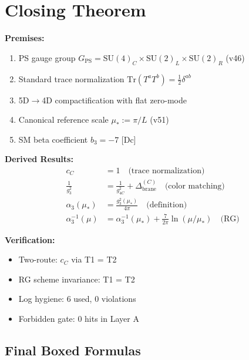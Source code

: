 \documentclass[11pt,a4paper]{article}
\theoremstyle{definition}
\begin{document}
\newpage

\section{Closing Theorem}
\label{sec:closing}

\begin{closurebox}
\textbf{Premises:}
\begin{enumerate}
  \item[P1.] PS gauge group $G_{\text{PS}} = \text{SU}(4)_C \times \text{SU}(2)_L \times \text{SU}(2)_R$ (v46)
  \item[P2.] Standard trace normalization $\text{Tr}(T^a T^b) = \frac{1}{2}\delta^{ab}$
  \item[P3.] 5D$\to$4D compactification with flat zero-mode
  \item[P4.] Canonical reference scale $\mu_* := \pi/L$ (v51)
  \item[P5.] SM beta coefficient $b_3 = -7$ [Dc]
\end{enumerate}

\textbf{Derived Results:}
\begin{align}
  \label{eq:closing-results}
  c_C &= 1 \quad \text{(trace normalization)} \\
  \frac{1}{g_3^2} &= \frac{1}{g_{4C}^2} + \Delta_{\text{brane}}^{(C)} \quad \text{(color matching)} \\
  \alpha_3(\mu_*) &= \frac{g_3^2(\mu_*)}{4\pi} \quad \text{(definition)} \\
  \alpha_3^{-1}(\mu) &= \alpha_3^{-1}(\mu_*) + \frac{7}{2\pi}\ln(\mu/\mu_*) \quad \text{(RG)}
\end{align}

\textbf{Verification:}
\begin{itemize}
  \item Two-route: $c_C$ via T1 = T2 \checkmark
  \item RG scheme invariance: T1 = T2 \checkmark
  \item Log hygiene: 6 used, 0 violations \checkmark
  \item Forbidden gate: 0 hits in Layer A \checkmark
\end{itemize}
\end{closurebox}

\subsection{Final Boxed Formulas}
\label{subsec:final-formulas}
\end{document}
